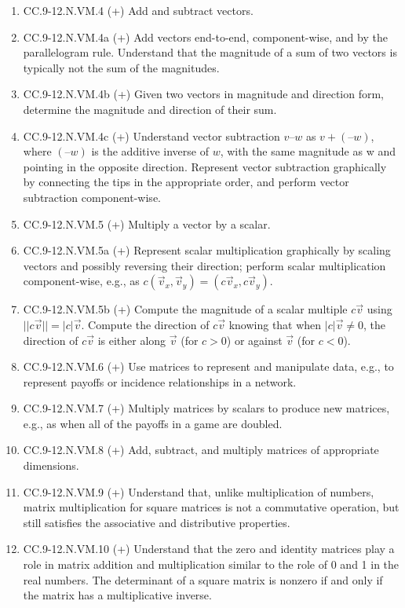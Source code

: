 \begin{enumerate}
	\item CC.9-12.N.VM.4 (+)  Add and subtract vectors.
	\item CC.9-12.N.VM.4a (+) Add vectors end-to-end, component-wise, and by the parallelogram rule. Understand that the magnitude of a sum of two vectors is typically not the sum of the magnitudes.
	\item CC.9-12.N.VM.4b (+) Given two vectors in magnitude and direction form, determine the magnitude and direction of their sum. 
	\item CC.9-12.N.VM.4c (+) Understand vector subtraction $v – w$ as $v + (–w)$, where $(–w)$ is the additive inverse of $w$, with the same magnitude as w and pointing in the opposite direction. Represent vector subtraction graphically by connecting the tips in the appropriate order, and perform vector subtraction component-wise.
	\item CC.9-12.N.VM.5 (+)  Multiply a vector by a scalar.
	\item CC.9-12.N.VM.5a (+) Represent scalar multiplication graphically by scaling vectors and possibly reversing their direction; perform scalar multiplication component-wise, e.g., as $c(\vec{v}_x, \vec{v}_y) = (c\vec{v}_x, c\vec{v}_y)$.
	\item CC.9-12.N.VM.5b (+) Compute the magnitude of a scalar multiple $c\vec{v}$ using $||c\vec{v}|| =|c|\vec{v}$. Compute the direction of $c\vec{v}$ knowing that when $|c|\vec{v} \neq 0$, the direction of $c\vec{v}$ is either along $\vec{v}$ (for $c > 0$) or against $\vec{v}$ (for $c < 0$).
	\item CC.9-12.N.VM.6 (+)  Use matrices to represent and manipulate data, e.g., to represent payoffs or incidence relationships in a network. 
	\item CC.9-12.N.VM.7 (+)  Multiply matrices by scalars to produce new matrices, e.g., as when all of the payoffs in a game are doubled. 
	\item CC.9-12.N.VM.8 (+)  Add, subtract, and multiply matrices of appropriate dimensions.
	\item CC.9-12.N.VM.9 (+) Understand that, unlike multiplication of numbers, matrix multiplication for square matrices is not a commutative operation, but still satisfies the associative and distributive properties. 
	\item CC.9-12.N.VM.10 (+) Understand that the zero and identity matrices play a role in matrix addition and multiplication similar to the role of 0 and 1 in the real numbers. The determinant of a square matrix is nonzero if and only if the matrix has a multiplicative inverse. 

\end{enumerate}
